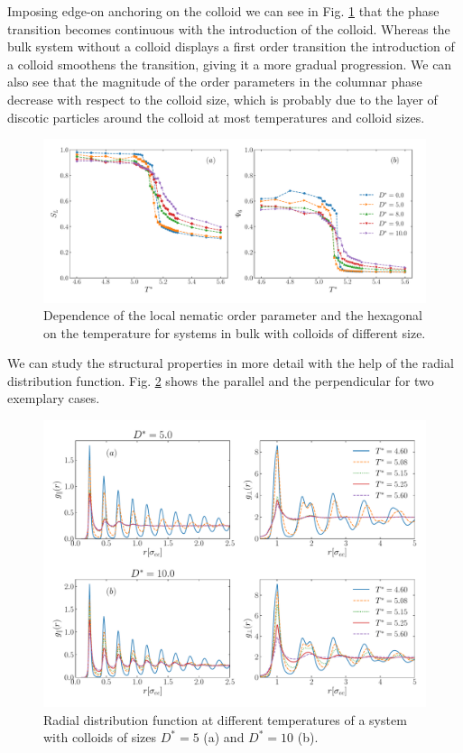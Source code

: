 Imposing edge-on anchoring on the colloid we can see in Fig. \ref{fig:beoc32lochex} that the phase transition becomes continuous with the introduction of the colloid. Whereas the bulk system without a colloid displays a first order transition the introduction of a colloid smoothens the transition, giving it a more gradual progression. We can also see that the magnitude of the order parameters in the columnar phase decrease with respect to the colloid size, which is probably due to the layer of discotic particles around the colloid at most temperatures and colloid sizes.
\begin{figure}[H]
    \centering
	\includegraphics[width=\linewidth]{plots/beo_C32_lochex.pdf}
	\caption{Dependence of the local nematic order parameter and the hexagonal on the temperature for systems in bulk with colloids of different size.}
    \label{fig:beoc32lochex}
\end{figure}
We can study the structural properties in more detail with the help of the radial distribution function. Fig. \ref{fig:beoc32rdf} shows the parallel and the perpendicular for two exemplary cases.  
\begin{figure}[H]
    \centering
	\includegraphics[width=\linewidth]{plots/beo_C32_rdf.pdf}
	\caption{Radial distribution function at different temperatures of a system with colloids of sizes $D^* =  5$ (a) and $D^* = 10$ (b).}
    \label{fig:beoc32rdf}
\end{figure}
